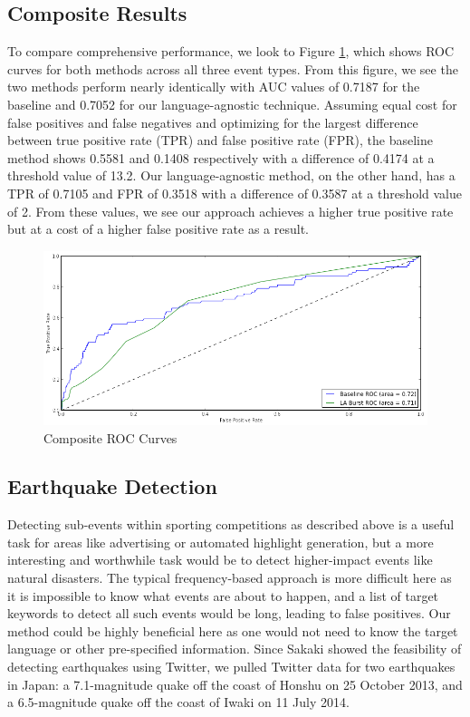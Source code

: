 \documentclass{acm_proc_article-sp}
\begin{document}
\subsection{Composite Results}

To compare comprehensive performance, we look to Figure \ref{fig:rocComprehensive}, which shows ROC curves for both methods across all three event types.
From this figure, we see the two methods perform nearly identically with AUC values of 0.7187 for the baseline and 0.7052 for our language-agnostic technique.
Assuming equal cost for false positives and false negatives and optimizing for the largest difference between true positive rate (TPR) and false positive rate (FPR), the baseline method shows 0.5581 and 0.1408 respectively with a difference of 0.4174 at a threshold value of 13.2.
Our language-agnostic method, on the other hand, has a TPR of 0.7105 and FPR of 0.3518 with a difference of 0.3587 at a threshold value of 2.
From these values, we see our approach achieves a higher true positive rate but at a cost of a higher false positive rate as a result.

\begin{figure}[hbtp]
\begin{center}
\includegraphics[width=5in]{./figures/roc_Comp.png}
\caption{Composite ROC Curves}
\label{fig:rocComprehensive}
\end{center}
\end{figure}

\subsection{Earthquake Detection}

Detecting sub-events within sporting competitions as described above is a useful task for areas like advertising or automated highlight generation, but a more interesting and worthwhile task would be to detect higher-impact events like natural disasters.
The typical frequency-based approach is more difficult here as it is impossible to know what events are about to happen, and a list of target keywords to detect all such events would be long, leading to false positives.
Our method could be highly beneficial here as one would not need to know the target language or other pre-specified information.
Since Sakaki showed the feasibility of detecting earthquakes using Twitter, we pulled Twitter data for two earthquakes in Japan: a 7.1-magnitude quake off the coast of Honshu on 25 October 2013, and a 6.5-magnitude quake off the coast of Iwaki on 11 July 2014.
\end{document}
